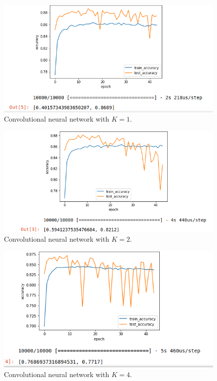 \documentclass[titlepage]{article}
\begin{document}
\begin{figure}[H]
	\centering
	\includegraphics[width=1.0\textwidth]{cb.png}
	\caption{Convolutional neural network with $K = 1$.}
\end{figure}
\begin{figure}[H]
	\centering
	\includegraphics[width=1.0\textwidth]{c1b.png}
	\caption{Convolutional neural network with $K = 2$.}
\end{figure}
\begin{figure}[H]
	\centering
	\includegraphics[width=1.0\textwidth]{c4b.png}
	\caption{Convolutional neural network with $K = 4$.}
\end{figure}
\end{document}
